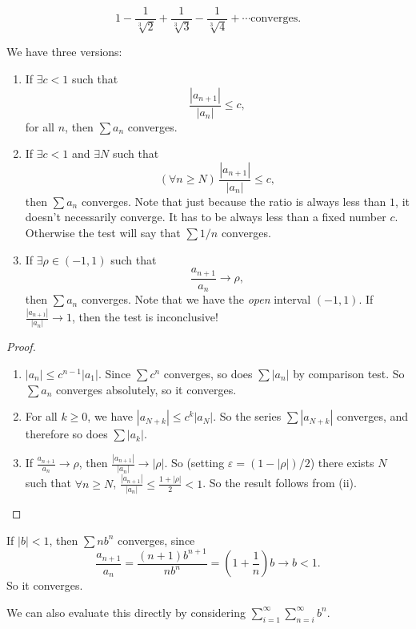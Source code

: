 \documentclass[a4paper]{article}
\begin{document}
\begin{eg}
  \[
    1 - \frac{1}{\sqrt[3]{2}} + \frac{1}{\sqrt[3]{3}} - \frac{1}{\sqrt[3]{4}} + \cdots \text{converges}.
  \]
\end{eg}

\begin{lemma}
  We have three versions:
  \begin{enumerate}
    \item If $\exists c < 1$ such that
      \[
        \frac{|a_{n + 1}|}{|a_n|} \leq c,
      \]
      for all $n$, then $\sum a_n$ converges.
    \item If $\exists c < 1$ and $\exists N$ such that
      \[
        (\forall n \geq N)\, \frac{|a_{n + 1}|}{|a_n|} \leq c,
      \]
      then $\sum a_n$ converges. Note that just because the ratio is always less than $1$, it doesn't necessarily converge. It has to be always less than a fixed number $c$. Otherwise the test will say that $\sum 1/n$ converges.
    \item If $\exists \rho \in (-1, 1)$ such that
      \[
        \frac{a_{n + 1}}{a_n} \to \rho,
      \]
      then $\sum a_n$ converges. Note that we have the \emph{open} interval $(-1, 1)$. If $\frac{|a_{n + 1}|}{|a_n|} \to 1$, then the test is inconclusive!
  \end{enumerate}
\end{lemma}

\begin{proof}\leavevmode
  \begin{enumerate}
    \item $|a_n| \leq c^{n - 1}|a_1|$. Since $\sum c^n$ converges, so does $\sum |a_n|$ by comparison test. So $\sum a_n$ converges absolutely, so it converges.
    \item For all $k\geq 0$, we have $|a_{N + k}|\leq c^k|a_N|$. So the series $\sum |a_{N + k}|$ converges, and therefore so does $\sum |a_k|$.
    \item If $\frac{a_{n + 1}}{a_n} \to \rho$, then $\frac{|a_{n + 1}|}{|a_n|} \to |\rho|$. So (setting $\varepsilon = (1 - |\rho|)/2$) there exists $N$ such that $\forall n \geq N$, $\frac{|a_{n + 1}|}{|a_n|} \leq \frac{1 + |\rho|}{2} < 1$. So the result follows from (ii).
  \end{enumerate}
\end{proof}

\begin{eg}
  If $|b| < 1$, then $\sum nb^n$ converges, since
  \[
    \frac{a_{n + 1}}{a_n} = \frac{(n + 1) b^{n + 1}}{nb^n} = \left(1 + \frac{1}{n}\right) b\to b < 1.
  \]
  So it converges.

  We can also evaluate this directly by considering $\displaystyle\sum_{i = 1}^\infty \sum_{n = i}^\infty b^n$.
\end{eg}
\end{document}
